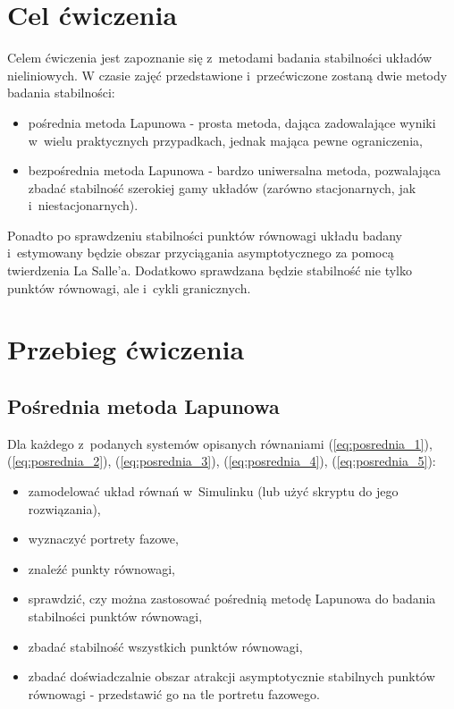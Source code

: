 \documentclass{sprawozdanie-agh}
\begin{document}

\stronatytulowa{}

\section{Cel ćwiczenia}
Celem ćwiczenia jest zapoznanie się z~metodami badania stabilności układów nieliniowych.
W czasie zajęć przedstawione i~przećwiczone zostaną dwie metody badania stabilności:
\begin{itemize}
    \item pośrednia metoda Lapunowa - prosta metoda, dająca zadowalające wyniki w~wielu praktycznych przypadkach, jednak mająca pewne ograniczenia,
    \item bezpośrednia metoda Lapunowa - bardzo uniwersalna metoda, pozwalająca zbadać stabilność szerokiej gamy układów (zarówno stacjonarnych, jak i~niestacjonarnych).
\end{itemize}
Ponadto po sprawdzeniu stabilności punktów równowagi układu badany i~estymowany będzie 
obszar przyciągania asymptotycznego za pomocą twierdzenia La Salle'a.
Dodatkowo sprawdzana będzie stabilność nie tylko punktów równowagi, ale i~cykli granicznych.

\section{Przebieg ćwiczenia}
    \subsection{Pośrednia metoda Lapunowa}
    Dla każdego z~podanych systemów opisanych równaniami (\ref{eq:posrednia_1}), (\ref{eq:posrednia_2}), (\ref{eq:posrednia_3}),  (\ref{eq:posrednia_4}),  (\ref{eq:posrednia_5}):
    \begin{itemize}
        \item zamodelować układ równań w~Simulinku (lub użyć skryptu do jego rozwiązania),
        \item wyznaczyć portrety fazowe,
        \item znaleźć punkty równowagi,
        \item sprawdzić, czy można zastosować pośrednią metodę Lapunowa do badania stabilności punktów równowagi,
        \item zbadać stabilność wszystkich punktów równowagi,
        \item zbadać doświadczalnie obszar atrakcji asymptotycznie stabilnych punktów równowagi - przedstawić go na tle portretu fazowego.
    \end{itemize}
\end{document}

